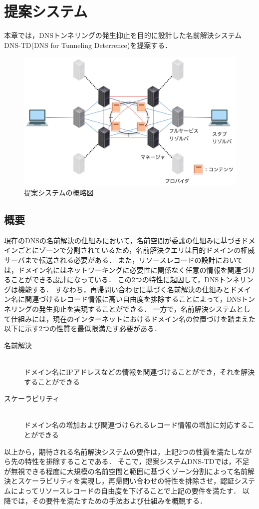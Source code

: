 \section{提案システム}
本章では，DNSトンネリングの発生抑止を目的に設計した名前解決システムDNS-TD(DNS for Tunneling Deterrence)を提案する．
\begin{figure}[h]
 \centering
 \label{fig:abstruct-DNS-TD-architecture}
 \includegraphics[scale=0.6]{figure/new-architecture-DNS-TD.png}
 \caption{提案システムの概略図}
\end{figure}
\subsection{概要}
\label{sec:DNS-TD}
現在のDNSの名前解決の仕組みにおいて，名前空間が委譲の仕組みに基づきドメインごとにゾーンで分割されているため，名前解決クエリは目的ドメインの権威サーバまで転送される必要がある．
また，リソースレコードの設計においては，ドメイン名にはネットワーキングに必要性に関係なく任意の情報を関連づけることができる設計になっている．
この2つの特性に起因して，DNSトンネリングは機能する．
すなわち，再帰問い合わせに基づく名前解決の仕組みとドメイン名に関連づけるレコード情報に高い自由度を排除することによって，DNSトンネリングの発生抑止を実現することができる．
一方で，名前解決システムとして仕組みには，現在のインターネットにおけるドメイン名の位置づけを踏まえた以下に示す2つの性質を最低限満たす必要がある．
\begin{description}
 \item[名前解決]\mbox{}\\ ドメイン名にIPアドレスなどの情報を関連づけることができ，それを解決することができる
 \item[スケーラビリティ]\mbox{}\\ ドメイン名の増加および関連づけられるレコード情報の増加に対応することができる
\end{description}
以上から，期待される名前解決システムの要件は，上記2つの性質を満たしながら先の特性を排除することである．
そこで，提案システムDNS-TDでは，不足が無視できる程度に大規模の名前空間と範囲に基づくゾーン分割によって名前解決とスケーラビリティを実現し，再帰問い合わせの特性を排除させ，認証システムによってリソースレコードの自由度を下げることで上記の要件を満たす．
以降では，その要件を満たすための手法および仕組みを概観する．\newline

